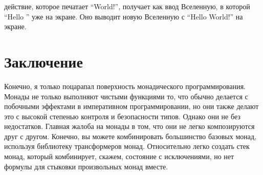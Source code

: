 действие, которое печатает ``World!'', получает как ввод Вселенную, в
которой ``Hello '' уже на экране. Оно выводит новую Вселенную
с ``Hello World!'' на экране.

\section{Заключение}

Конечно, я только поцарапал поверхность монадического программирования.
Монады не только выполняют чистыми функциями то, что обычно делается
с побочными эффектами в императивном программировании, но они также делают это с
высокой степенью контроля и безопасности типов. Однако они не без недостатков.
Главная жалоба на монады в том, что они не легко
композируются друг с другом. Конечно, вы можете комбинировать большинство базовых
монад, используя библиотеку трансформеров монад. Относительно легко
создать стек монад, который комбинирует, скажем, состояние с исключениями, но
нет формулы для стыковки произвольных монад вместе.
